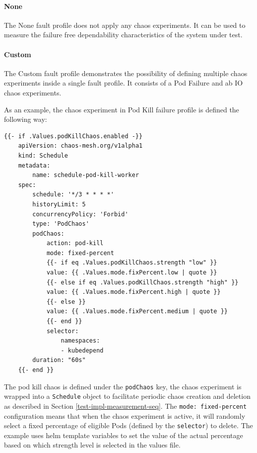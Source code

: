 \paragraph{None} The None fault profile does not apply any chaos experiments. It can be used to measure the failure free dependability characteristics of the system under test.

\paragraph{Custom} The Custom fault profile demonstrates the possibility of defining multiple chaos experiments inside a single fault profile. It consists of a Pod Failure and ab IO chaos experiments.

As an example, the chaos experiment in Pod Kill failure profile is defined the following way:

\vspace{0.5cm}
\begin{minipage}{\linewidth}
	\begin{lstlisting}[caption={Pod Kill chaos}, label={lst:pod-kill-chaos}]
	{{- if .Values.podKillChaos.enabled -}}
	apiVersion: chaos-mesh.org/v1alpha1
	kind: Schedule
	metadata:
		name: schedule-pod-kill-worker
	spec:
		schedule: '*/3 * * * *'
		historyLimit: 5
		concurrencyPolicy: 'Forbid'
		type: 'PodChaos'
		podChaos:
			action: pod-kill
			mode: fixed-percent
			{{- if eq .Values.podKillChaos.strength "low" }}
			value: {{ .Values.mode.fixPercent.low | quote }}
			{{- else if eq .Values.podKillChaos.strength "high" }}
			value: {{ .Values.mode.fixPercent.high | quote }}
			{{- else }}
			value: {{ .Values.mode.fixPercent.medium | quote }}
			{{- end }}
			selector:
				namespaces:
				- kubedepend
		duration: "60s"
	{{- end }}\end{lstlisting}
\end{minipage}

The pod kill chaos is defined under the \texttt{podChaos} key, the chaos experiment is wrapped into a \texttt{Schedule} object to facilitate periodic chaos creation and deletion as described in Section \ref{test-impl-measurement-seq}. The \texttt{mode: fixed-percent} configuration means that when the chaos experiment is active, it will randomly select a fixed percentage of eligible Pods (defined by the \texttt{selector}) to delete. The example uses helm template variables to set the value of the actual percentage based on which strength level is selected in the values file.

